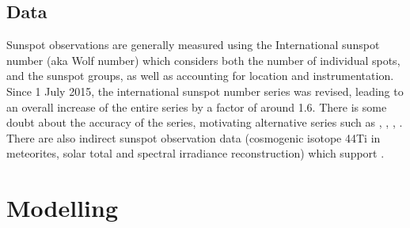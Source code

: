 \documentclass[11pt]{article}
\begin{document}
\subsection{Data}
Sunspot observations are generally measured using the International sunspot number (aka Wolf number) which considers both the number of individual spots, and the sunspot groups, as well as accounting for location and instrumentation. 
Since 1 July 2015, the international sunspot number series was revised, leading to an overall increase of the entire series by a factor of around 1.6. 
There is some doubt about the accuracy of the series, motivating alternative series such as \cite{lockwood2014}, \cite{svalgaard2016}, \cite{usoskin2016}, \cite{chatzistergos2017}. 
There are also indirect sunspot observation data (cosmogenic isotope 44Ti in meteorites, solar total and spectral irradiance reconstruction) which support \cite{chatzistergos2017}. 

\section{Modelling}

\newpage
\appendix


\end{document}
